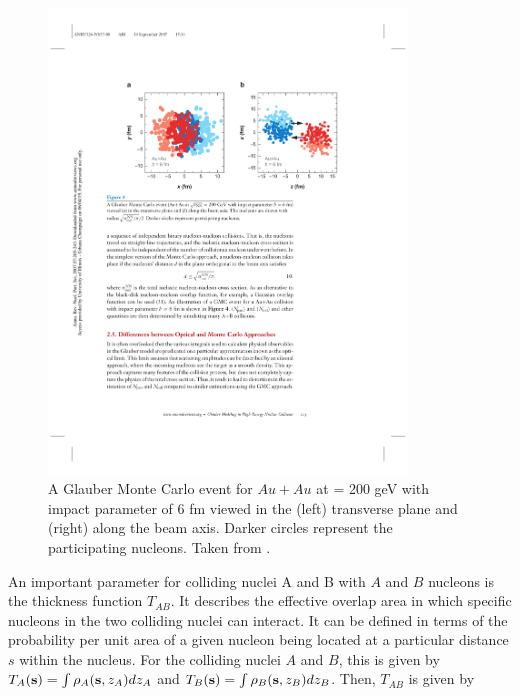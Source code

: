 \begin{figure}[htbp]
\begin{center}
\includegraphics[width=0.85\textwidth]{figures/theory/glauberMC}
\caption{A Glauber Monte Carlo event for $Au+Au$ at \sqrtsnn = 200 geV with impact parameter of 6 fm viewed in the (left) transverse plane and (right) along the beam axis.
Darker circles represent the participating nucleons.
Taken from \cite{doi:10.1146/annurev.nucl.57.090506.123020}.}
\label{fig:glauberMC}
\end{center}
\end{figure}



An important parameter for colliding nuclei A and B with $A$ and $B$ nucleons is the thickness function $T_{AB}$.
It describes the effective overlap area in which specific nucleons in the two colliding nuclei can interact.
It can be defined in terms of the probability per unit area of a given nucleon being located at a particular distance $s$ within the nucleus.
For the colliding nuclei $A$ and $B$, this is given by $T_{A}({\bf{s}}) = \int \rho_A ({\bf{s}}, z_A) dz_{A}$ and $T_{B}({\bf{s}}) = \int \rho_B ({\bf{s}}, z_B) dz_{B}$.
Then, $T_{AB}$ is given by

